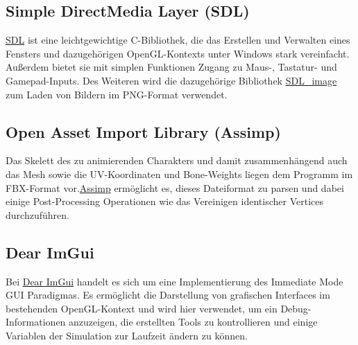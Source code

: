 \subsection{Simple DirectMedia Layer (SDL)}
\href{https://www.libsdl.org/index.php}{SDL} ist eine leichtgewichtige C-Bibliothek, die das Erstellen und Verwalten eines Fensters und dazugehörigen OpenGL-Kontexts unter Windows stark vereinfacht. Außerdem bietet sie mit simplen Funktionen Zugang zu Maus-, Tastatur- und Gamepad-Inputs. Des Weiteren wird die dazugehörige Bibliothek \href{https://www.libsdl.org/projects/SDL_image/}{SDL_image} zum Laden von Bildern im PNG-Format verwendet.

\subsection{Open Asset Import Library (Assimp)}
Das Skelett des zu animierenden Charakters und damit zusammenhängend auch das Mesh sowie die UV-Koordinaten und Bone-Weights liegen dem Programm im FBX-Format vor.\href{http://assimp.org/}{Assimp} ermöglicht es, dieses Dateiformat zu parsen und dabei einige Post-Processing Operationen wie das Vereinigen identischer Vertices durchzuführen.

\subsection{Dear ImGui}
Bei \href{https://github.com/ocornut/imgui}{Dear ImGui} handelt es sich um eine Implementierung des Immediate Mode GUI Paradigmas. Es ermöglicht die Darstellung von grafischen Interfaces im bestehenden OpenGL-Kontext und wird hier verwendet, um ein Debug-Informationen anzuzeigen, die erstellten Tools zu kontrollieren und einige Variablen der Simulation zur Laufzeit ändern zu können.